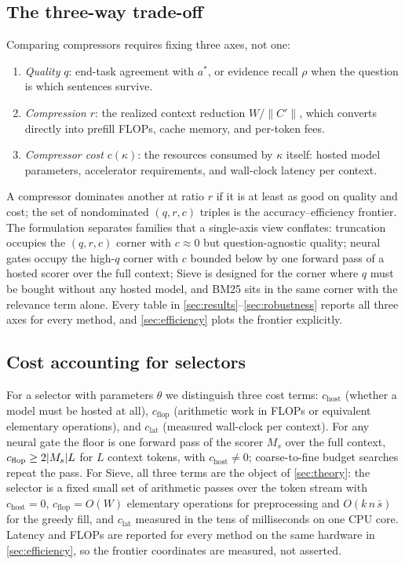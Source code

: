 \documentclass[review,12pt]{elsarticle}
\DeclarePairedDelimiter\abs{\lvert}{\rvert}
\theoremstyle{remark}
\newcommand{\method}{Sieve}
\begin{document}
\subsection{The three-way trade-off}
\label{sec:tradeoff}
Comparing compressors requires fixing three axes, not one:
\begin{enumerate}[label=(\roman*)]
\item \emph{Quality} $q$: end-task agreement with $a^{*}$, or evidence
recall $\rho$ when the question is which sentences survive.
\item \emph{Compression} $r$: the realized context reduction
$W / \lVert C' \rVert$, which converts directly into prefill FLOPs,
cache memory, and per-token fees.
\item \emph{Compressor cost} $c(\kappa)$: the resources consumed by
$\kappa$ itself: hosted model parameters, accelerator requirements,
and wall-clock latency per context.
\end{enumerate}
A compressor dominates another at ratio $r$ if it is at least as good
on quality and cost; the set of nondominated $(q, r, c)$ triples is
the accuracy--efficiency frontier. The formulation separates families
that a single-axis view conflates: truncation occupies the $(q, r, c)$
corner with $c \approx 0$ but question-agnostic quality; neural gates
occupy the high-$q$ corner with $c$ bounded below by one forward pass
of a hosted scorer over the full context; \method{} is designed for
the corner where $q$ must be bought without any hosted model, and BM25
sits in the same corner with the relevance term alone. Every table in
\autoref{sec:results}--\autoref{sec:robustness} reports all three axes
for every method, and \autoref{sec:efficiency} plots the frontier
explicitly.

\subsection{Cost accounting for selectors}
For a selector with parameters $\theta$ we distinguish three cost
terms: $c_{\mathrm{host}}$ (whether a model must be hosted at all),
$c_{\mathrm{flop}}$ (arithmetic work in FLOPs or equivalent elementary
operations), and $c_{\mathrm{lat}}$ (measured wall-clock per context).
For any neural gate the floor is one forward pass of the scorer $M_s$
over the full context, $c_{\mathrm{flop}} \ge 2\abs{M_s} L$ for $L$
context tokens, with $c_{\mathrm{host}} \ne 0$; coarse-to-fine budget
searches repeat the pass. For \method{}, all three terms are the
object of \autoref{sec:theory}: the selector is a fixed small set of
arithmetic passes over the token stream with
$c_{\mathrm{host}} = 0$, $c_{\mathrm{flop}} = O(W)$ elementary
operations for preprocessing and $O(k\,n\,\bar{s})$ for the greedy
fill, and $c_{\mathrm{lat}}$ measured in the tens of milliseconds on
one CPU core. Latency and FLOPs are reported for every method on the
same hardware in \autoref{sec:efficiency}, so the frontier
coordinates are measured, not asserted.
\end{document}

